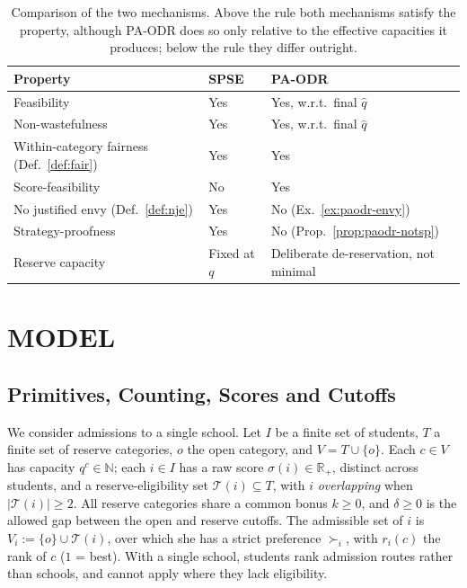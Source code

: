 \documentclass[a4paper,twoside]{article}
\theoremstyle{definition}
\renewcommand{\T}{\mathcal{T}}
\renewcommand{\R}{\mathbb{R}}
\begin{document}
\begin{table}[t]
\caption{Comparison of the two mechanisms. Above the rule both mechanisms satisfy the property, although PA-ODR does so only relative to the effective capacities it produces; below the rule they differ outright.}
\label{tab:comparison}
\centering
\renewcommand{\arraystretch}{1.15}
\small
\begin{tabular}{|L{0.25\textwidth}|L{0.28\textwidth}|L{0.35\textwidth}|}
\hline
\textbf{Property} & \textbf{SPSE} & \textbf{PA-ODR} \\
\hline
Feasibility & Yes & Yes, w.r.t.\ final $\hat q$ \\
Non-wastefulness & Yes & Yes, w.r.t.\ final $\hat q$ \\
Within-category fairness (Def.~\ref{def:fair}) & Yes & Yes \\
\hline
Score-feasibility & No & Yes \\
No justified envy (Def.~\ref{def:nje}) & Yes & No (Ex.~\ref{ex:paodr-envy}) \\
Strategy-proofness & Yes & No (Prop.~\ref{prop:paodr-notsp}) \\
Reserve capacity & Fixed at $q$ & Deliberate de-reservation, not minimal \\
\hline
\end{tabular}
\end{table}

\section{\uppercase{Model}}
\label{sec:model}

\subsection{Primitives, Counting, Scores and Cutoffs}

We consider admissions to a single school. Let $I$ be a finite set of students, $T$ a finite set of reserve categories, $o$ the open category, and $V=T\cup\{o\}$. Each $c\in V$ has capacity $q^c\in\mathbb{N}$; each $i\in I$ has a raw score $\sigma(i)\in\R_+$, distinct across students, and a reserve-eligibility set $\T(i)\subseteq T$, with $i$ \emph{overlapping} when $|\T(i)|\ge2$. All reserve categories share a common bonus $k\ge0$, and $\delta\ge0$ is the allowed gap between the open and reserve cutoffs. The admissible set of $i$ is $V_i:=\{o\}\cup\T(i)$, over which she has a strict preference $\succ_i$, with $r_i(c)$ the rank of $c$ ($1$ = best). With a single school, students rank admission routes rather than schools, and cannot apply where they lack eligibility.
\end{document}
